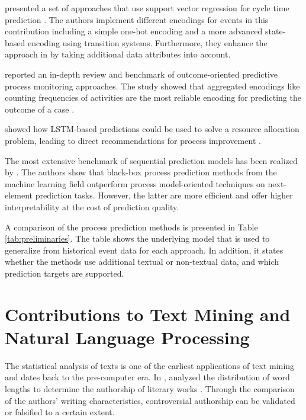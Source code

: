 \citeauthor{DBLP:journals/computing/PolatoSBL18} presented a set of approaches that use support vector regression for cycle time prediction  \cite{DBLP:journals/computing/PolatoSBL18}.
The authors implement different encodings for events in this contribution including a simple one-hot encoding and a more advanced state-based encoding using transition systems.
Furthermore, they enhance the approach in \cite{DBLP:journals/is/AalstSS11} by taking additional data attributes into account.

\citeauthor{DBLP:journals/tkdd/TeinemaaDRM19} reported an in-depth review and benchmark of outcome-oriented predictive process monitoring approaches.
The study showed that aggregated encodings like counting frequencies of activities are the most reliable encoding for predicting the outcome of a case \cite{DBLP:journals/tkdd/TeinemaaDRM19}.

\citeauthor{DBLP:conf/icpm/ParkS19} showed how LSTM-based predictions could be used to solve a resource allocation problem, leading to direct recommendations for process improvement \cite{DBLP:conf/icpm/ParkS19}.

The most extensive benchmark of sequential prediction models has been realized by \citeauthor{DBLP:journals/sosym/TaxTZ20} \cite{DBLP:journals/sosym/TaxTZ20}.
The authors show that black-box process prediction methods from the machine learning field outperform process model-oriented techniques on next-element prediction tasks.
However, the latter are more efficient and offer higher interpretability at the cost of prediction quality.


A comparison of the process prediction methods is presented in Table \ref{tab:preliminaries}.
The table shows the underlying model that is used to generalize from historical event data for each approach.
In addition, it states whether the methods use additional textual or non-textual data, and which prediction targets are supported.

\section{Contributions to Text Mining and Natural Language Processing}

The statistical analysis of texts is one of the earliest applications of text mining and dates back to the pre-computer era.
In \citeyear{mendenhall1887characteristic}, \citeauthor{mendenhall1887characteristic} analyzed the distribution of word lengths to determine the authorship of literary works \cite{mendenhall1887characteristic}.
Through the comparison of the authors’ writing characteristics, controversial authorship can be validated or falsified to a certain extent.

